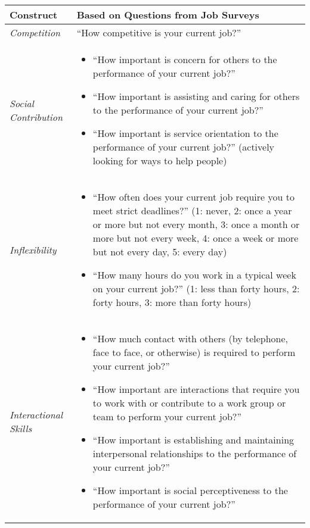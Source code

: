     \begin{tabular}{@{}p{4cm}p{11cm}@{}}
    \toprule
    \textbf{Construct} & \textbf{Based on Questions from Job Surveys} \\
    \midrule
    
    \textit{Competition} & “How competitive is your current job?” \\
    
    \midrule
    \textit{Social Contribution} & 
    \begin{itemize}
      \item “How important is concern for others to the performance of your current job?”
      \item “How important is assisting and caring for others to the performance of your current job?”
      \item “How important is service orientation to the performance of your current job?” (actively looking for ways to help people)
    \end{itemize} \\
    
    \midrule
    \textit{Inflexibility} & 
    \begin{itemize}
      \item “How often does your current job require you to meet strict deadlines?”  
      \newline (1: never, 2: once a year or more but not every month, 3: once a month or more but not every week, 4: once a week or more but not every day, 5: every day)
      \item “How many hours do you work in a typical week on your current job?”  
      \newline (1: less than forty hours, 2: forty hours, 3: more than forty hours)
    \end{itemize} \\
    
    \midrule
    \textit{Interactional Skills} & 
    \begin{itemize}
      \item “How much contact with others (by telephone, face to face, or otherwise) is required to perform your current job?”
      \item “How important are interactions that require you to work with or contribute to a work group or team to perform your current job?”
      \item “How important is establishing and maintaining interpersonal relationships to the performance of your current job?”
      \item “How important is social perceptiveness to the performance of your current job?”
    \end{itemize} \\
    

\end{tabular}
